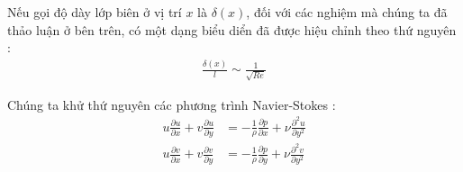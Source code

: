 \documentclass[THUY_DONG_HOC.tex]{subfiles}
\begin{document}
Nếu gọi độ dày lớp biên ở vị trí $x$ là $\delta(x)$, đối với các nghiệm mà chúng ta đã thảo luận ở bên trên, có một dạng biểu diển đã được hiệu chỉnh theo thứ nguyên :
\begin{equation}
	\begin{aligned}
		\frac{\delta(x)}{l}\sim\frac{1}{\sqrt{Re}}
	\end{aligned}
\end{equation}

Chúng ta khử thứ nguyên các phương trình Navier-Stokes :
\begin{equation}
	\begin{aligned}
		u\frac{{\partial u}}{{\partial x}} + v\frac{{\partial u}}{{\partial y}} &=  - \frac{1}{\rho }\frac{{\partial p}}{{\partial x}} + \nu \frac{{{\partial ^2}u}}{{\partial {y^2}}}\\
		u\frac{{\partial v}}{{\partial x}} + v\frac{{\partial v}}{{\partial y}} &=  - \frac{1}{\rho }\frac{{\partial p}}{{\partial y}} + \nu \frac{{{\partial ^2}v}}{{\partial {y^2}}}
	\end{aligned}
\end{equation}
\end{document}
